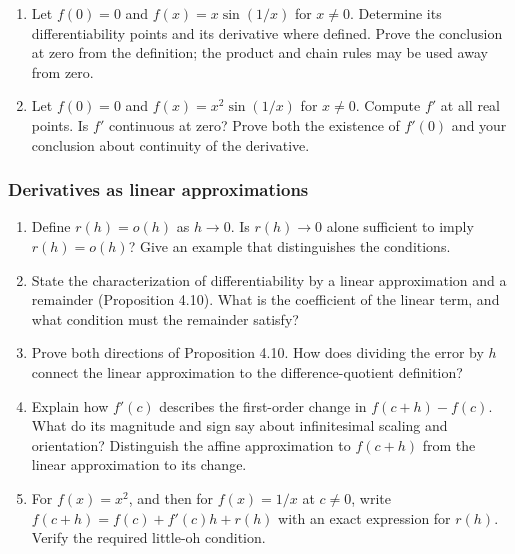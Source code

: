 \begin{enumerate}
  \item Let \(f(0)=0\) and \(f(x)=x\sin(1/x)\) for \(x\ne0\).
    Determine its differentiability points and its derivative where
    defined. Prove the conclusion at zero from the definition;
    the product and chain rules may be used away from zero.

  \item Let \(f(0)=0\) and \(f(x)=x^2\sin(1/x)\) for \(x\ne0\).
    Compute \(f'\) at all real points. Is \(f'\) continuous at zero?
    Prove both the existence of \(f'(0)\) and your conclusion about
    continuity of the derivative.
\end{enumerate}

\subsubsection*{Derivatives as linear approximations}
\begin{enumerate}[resume]
  \item Define \(r(h)=o(h)\) as \(h\to0\).
    Is \(r(h)\to0\) alone sufficient to imply \(r(h)=o(h)\)?
    Give an example that distinguishes the conditions.

  \item State the characterization of differentiability by a linear
    approximation and a remainder (Proposition 4.10).
    What is the coefficient of the linear term, and what condition
    must the remainder satisfy?

  \item Prove both directions of Proposition 4.10.
    How does dividing the error by \(h\) connect the linear
    approximation to the difference-quotient definition?

  \item Explain how \(f'(c)\) describes the first-order change in
    \(f(c+h)-f(c)\). What do its magnitude and sign say about
    infinitesimal scaling and orientation? Distinguish the affine
    approximation to \(f(c+h)\) from the linear approximation to
    its change.

  \item For \(f(x)=x^2\), and then for \(f(x)=1/x\) at \(c\ne0\),
    write \(f(c+h)=f(c)+f'(c)h+r(h)\) with an exact expression
    for \(r(h)\). Verify the required little-oh condition.
\end{enumerate}

